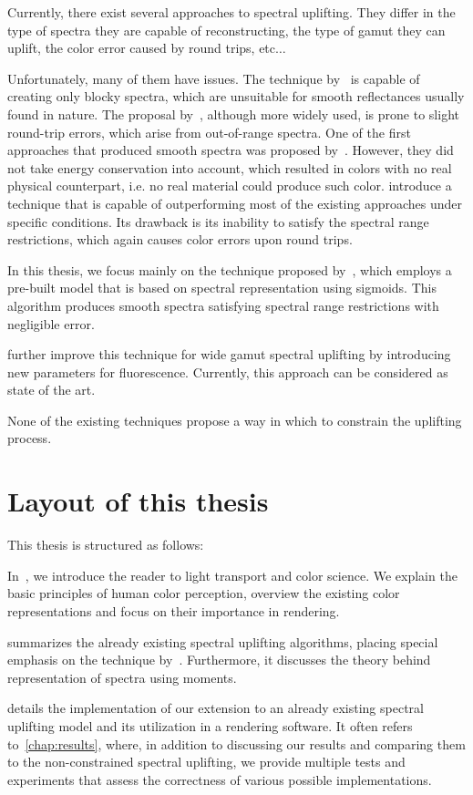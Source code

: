 Currently, there exist several approaches to spectral uplifting. They differ in the type of spectra they are capable of reconstructing, the type of gamut they can uplift, the color error caused by round trips, etc$\ldots$

Unfortunately, many of them have issues. The technique by~\citet{upsamplingMacAdam} is capable of creating only blocky spectra, which are unsuitable for smooth reflectances usually found in nature. The proposal by~\citet{upsamplingSmits}, although more widely used, is prone to slight round-trip errors, which arise from out-of-range spectra. One of the first approaches that produced smooth spectra was proposed by~\citet{upsamplingMeng}. However, they did not take energy conservation into account, which resulted in colors with no real physical counterpart, i.e. no real material could produce such color. \citet{upsamplingOtsu} introduce a technique that is capable of outperforming most of the existing approaches under specific conditions. Its drawback is its inability to satisfy the spectral range restrictions, which again causes color errors upon round trips.

In this thesis, we focus mainly on the technique proposed by~\citet{upsamplingJakobHanika}, which employs a pre-built model that is based on spectral representation using sigmoids. This algorithm produces smooth spectra satisfying spectral range restrictions with negligible error.

\citet{upsamplingFluorescence} further improve this technique for wide gamut spectral uplifting by introducing new parameters for fluorescence. Currently, this approach can be considered as state of the art.

None of the existing techniques propose a way in which to constrain the uplifting process.

\section*{Layout of this thesis}

This thesis is structured as follows:

In~, we introduce the reader to light transport and color science. We explain the basic principles of human color perception, overview the existing color representations and focus on their importance in rendering.

 summarizes the already existing spectral uplifting algorithms, placing special emphasis on the technique by~\citet{upsamplingJakobHanika}. Furthermore, it discusses the theory behind representation of spectra using moments.

 details the implementation of our extension to an already existing spectral uplifting model and its utilization in a rendering software. It often refers to~\cref{chap:results}, where, in addition to discussing our results and comparing them to the non-constrained spectral uplifting, we provide multiple tests and experiments that assess the correctness of various possible implementations.